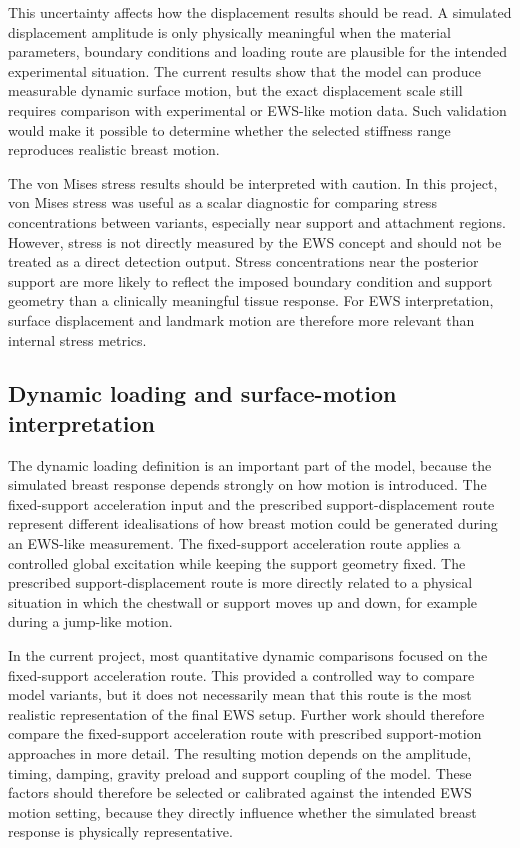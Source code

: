 This uncertainty affects how the displacement results should be read. A simulated displacement amplitude is only physically meaningful when the material parameters, boundary conditions and loading route are plausible for the intended experimental situation. The current results show that the model can produce measurable dynamic surface motion, but the exact displacement scale still requires comparison with experimental or EWS-like motion data. Such validation would make it possible to determine whether the selected stiffness range reproduces realistic breast motion.

The von Mises stress results should be interpreted with caution. In this project, von Mises stress was useful as a scalar diagnostic for comparing stress concentrations between variants, especially near support and attachment regions. However, stress is not directly measured by the EWS concept and should not be treated as a direct detection output. Stress concentrations near the posterior support are more likely to reflect the imposed boundary condition and support geometry than a clinically meaningful tissue response. For EWS interpretation, surface displacement and landmark motion are therefore more relevant than internal stress metrics.


\subsection{Dynamic loading and surface-motion interpretation}
\label{discussion_dynamic_loading_surface_motion}

The dynamic loading definition is an important part of the model, because the simulated breast response depends strongly on how motion is introduced. The fixed-support acceleration input and the prescribed support-displacement route represent different idealisations of how breast motion could be generated during an EWS-like measurement. The fixed-support acceleration route applies a controlled global excitation while keeping the support geometry fixed. The prescribed support-displacement route is more directly related to a physical situation in which the chestwall or support moves up and down, for example during a jump-like motion.

In the current project, most quantitative dynamic comparisons focused on the fixed-support acceleration route. This provided a controlled way to compare model variants, but it does not necessarily mean that this route is the most realistic representation of the final EWS setup. Further work should therefore compare the fixed-support acceleration route with prescribed support-motion approaches in more detail. The resulting motion depends on the amplitude, timing, damping, gravity preload and support coupling of the model. These factors should therefore be selected or calibrated against the intended EWS motion setting, because they directly influence whether the simulated breast response is physically representative.

